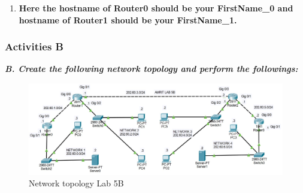 \documentclass[a4paper,11pt]{article}
\begin{document}
\begin{enumerate}
\begin{itemize}
          \end{itemize}



    \item\textbf{ Here the hostname of Router0 should be your FirstName\_0 and hostname of Router1 should be your FirstName\_1.}




\end{enumerate}




\pagebreak

%
%
%


%
%
%

\subsubsection{Activities B}

{\bfseries \textit{B. Create the following network topology and perform the followings:}}

\begin{figure}[H]
    \centering
    \includegraphics[scale=0.48,cframe=blue 0.5pt 3pt]{Lab5B.jpg}
    \caption{Network topology Lab 5B}
\end{figure}
\end{document}
